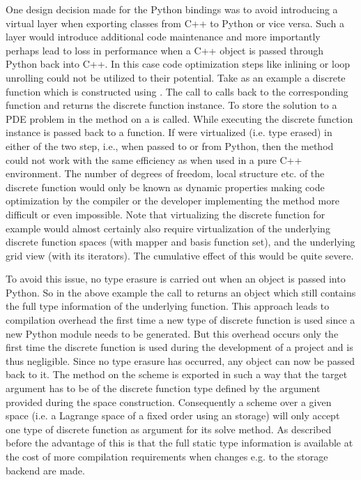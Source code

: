
One design decision made for the \dune Python bindings was to avoid
introducing a virtual layer when exporting classes from C++ to Python or
vice versa. Such a layer would introduce additional code maintenance
and more importantly perhaps lead to loss in performance when a C++ object
is passed through Python back into C++. In this case code optimization
steps like inlining or loop unrolling could not be utilized to their
potential. Take as an example a discrete function which is constructed
using . The call to
 calls back to the corresponding \dune[fem] function and
returns the discrete function instance. To store the solution to a PDE
problem in  the  method on a  is
called. While executing  the discrete
function instance is passed back to a \dune[fem] function. If 
were virtualized (i.e. type erased) in either of the two step, i.e., when
passed to or from Python, then the  method could not work with
the same efficiency as when used in a pure C++ environment. The number of
degrees of freedom, local structure etc. of the discrete function would
only be known as dynamic properties making code optimization by the compiler
or the \dune developer implementing the  method more difficult
or even impossible. Note that virtualizing the discrete function for
example would almost certainly also require virtualization of the
underlying discrete function spaces (with mapper and basis function set),
and the underlying grid view (with its iterators). The cumulative effect
of this would be quite severe.

To avoid this issue, no type erasure is carried out
when an object is passed into Python. So in the above example the call to
 returns an object which still contains the full type
information of the underlying \dune[fem] function. This approach leads to
compilation overhead the first time a new type of discrete function is used
since a new Python module needs to be generated. But this overhead occurs only
the first time the discrete function is used during the development of a
project and is thus negligible. Since no type erasure has occurred,
any \dune object can now be passed back to it. The  method on the scheme is
exported in such a way that the target argument has to be of the discrete
function type defined by the  argument provided during the
space construction. Consequently a scheme over a given space (i.e. a
Lagrange space of a fixed order using an  storage)
will only accept one type of discrete function as  argument
for its solve method. As described before the advantage of this is that the
full static type information is available at the cost of more compilation
requirements when changes e.g. to the storage backend are made.

